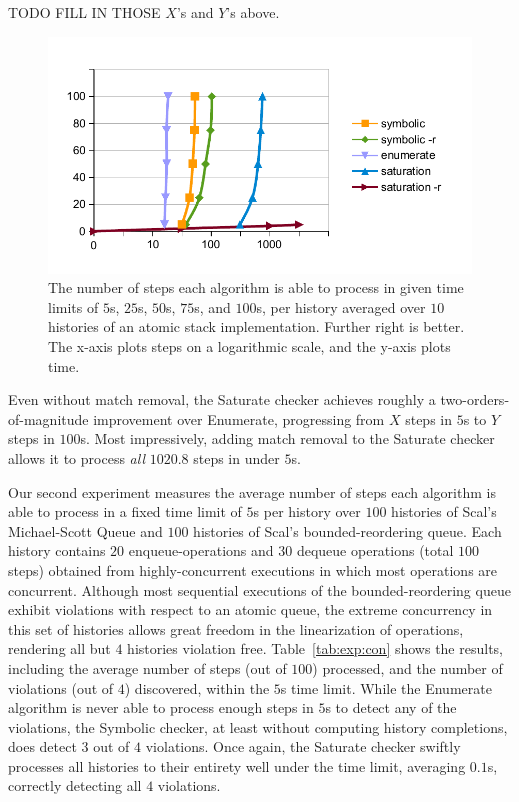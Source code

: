 TODO FILL IN THOSE $X$'s and $Y$'s above.

\begin{figure}[t]
  \centering
  \includegraphics[width=\linewidth]{figures/new_chart}
  \caption{The number of steps each algorithm is able to process in given time
  limits of $5$s, $25$s, $50$s, $75$s, and $100$s, per history averaged over
  $10$ histories of an atomic stack implementation. Further right is better.
  The x-axis plots steps on a logarithmic scale, and the y-axis plots time.}
  \label{fig:steprace}
\end{figure}

Even without match removal, the {\sc Saturate} checker achieves roughly a
two-orders-of-magnitude improvement over {\sc Enumerate}, progressing from $X$
steps in $5$s to $Y$ steps in $100$s. Most impressively, adding match removal
to the {\sc Saturate} checker allows it to process \emph{all} $1020.8$ steps in
under $5$s.

Our second experiment measures the average number of steps each algorithm is
able to process in a fixed time limit of $5$s per history over $100$ histories
of Scal's Michael-Scott Queue and $100$ histories of Scal's bounded-reordering
queue. Each history contains $20$ {\sf enqueue}-operations and $30$ {\sf
dequeue} operations (total $100$ steps) obtained from highly-concurrent
executions in which most operations are concurrent. Although most sequential
executions of the bounded-reordering queue exhibit violations with respect to
an atomic queue, the extreme concurrency in this set of histories allows great
freedom in the linearization of operations, rendering all but $4$ histories
violation free. Table~\ref{tab:exp:con} shows the results, including the
average number of steps (out of $100$) processed, and the number of violations
(out of $4$) discovered, within the $5$s time limit. While the {\sc Enumerate}
algorithm is never able to process enough steps in $5$s to detect any of the
violations, the {\sc Symbolic} checker, at least without computing history
completions, does detect $3$ out of $4$ violations. Once again, the {\sc
Saturate} checker swiftly processes all histories to their entirety well under
the time limit, averaging $0.1$s, correctly detecting all $4$ violations.

